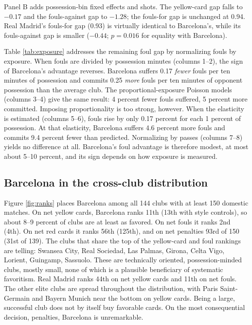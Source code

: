 Panel B adds possession-bin fixed effects and shots. The yellow-card gap falls to $-0.17$ and the fouls-against gap to $-1.28$; the fouls-for gap is unchanged at 0.94. Real Madrid's fouls-for gap (0.93) is virtually identical to Barcelona's, while its fouls-against gap is smaller ($-0.44$; $p = 0.016$ for equality with Barcelona).

Table \ref{tab:exposure} addresses the remaining foul gap by normalizing fouls by exposure. When fouls are divided by possession minutes (columns 1--2), the sign of Barcelona's advantage reverses. Barcelona suffers 0.17 \emph{fewer} fouls per ten minutes of possession and commits 0.25 \emph{more} fouls per ten minutes of opponent possession than the average club. The proportional-exposure Poisson models (columns 3--4) give the same result: 4 percent fewer fouls suffered, 5 percent more committed. Imposing proportionality is too strong, however. When the elasticity is estimated (columns 5--6), fouls rise by only 0.17 percent for each 1 percent of possession. At that elasticity, Barcelona suffers 4.6 percent more fouls and commits 9.4 percent fewer than predicted. Normalizing by passes (columns 7--8) yields no difference at all. Barcelona's foul advantage is therefore modest, at most about 5--10 percent, and its sign depends on how exposure is measured.

\subsection{Barcelona in the cross-club distribution}

Figure \ref{fig:ranks} places Barcelona among all 144 clubs with at least 150 domestic matches. On net yellow cards, Barcelona ranks 11th (13th with style controls), so about 8--9 percent of clubs are at least as favored. On net fouls it ranks 2nd (4th). On net red cards it ranks 56th (125th), and on net penalties 93rd of 150 (31st of 139). The clubs that share the top of the yellow-card and foul rankings are telling: Swansea City, Real Sociedad, Las Palmas, Girona, Celta Vigo, Lorient, Guingamp, Sassuolo. These are technically oriented, possession-minded clubs, mostly small, none of which is a plausible beneficiary of systematic favoritism. Real Madrid ranks 44th on net yellow cards and 11th on net fouls. The other elite clubs are spread throughout the distribution, with Paris Saint-Germain and Bayern Munich near the bottom on yellow cards. Being a large, successful club does not by itself buy favorable cards. On the most consequential decision, penalties, Barcelona is unremarkable.


